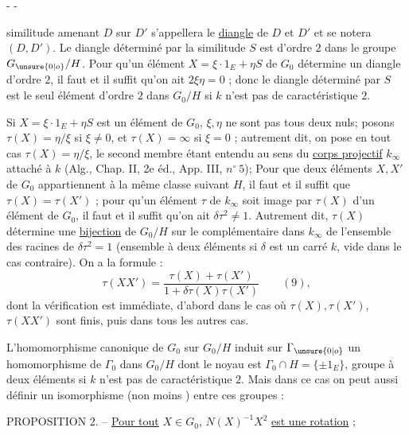 -  -

similitude amenant $D$ sur $D'$ s'appellera le \uline{diangle} de $D$ et $D'$ et se notera $(D,D')$. Le diangle déterminé par la similitude $S$ est d'ordre $2$ dans le groupe $G_{\unsure{0|o}}/H$. Pour qu'un élément $X=\xi\cdot1_E+\eta S$ de $G_0$ détermine un diangle d'ordre $2$, il faut et il suffit qu'on ait $2\xi\eta=0$ ; donc le diangle déterminé par $S$ est le seul élément d'ordre $2$ dans $G_0/H$ si $k$ n'est pas de caractéristique $2$.

Si $X=\xi\cdot1_E+\eta S$ est un élément de $G_0$, $\xi,\eta$ ne sont pas tous deux nuls; posons $\tau(X)=\eta/\xi$ si $\xi\ne0$, et $\tau(X)=\infty$ si $\xi=0$ ; autrement dit, on pose en tout cas $\tau(X)=\eta/\xi$, le second membre étant entendu au sens du \uline{corps projectif} $k_\infty$ attaché à $k$ (Alg., Chap. II, 2e éd., App. III, $n^\circ\ 5$); Pour que deux éléments $X,X'$ de $G_0$ appartiennent à la même classe suivant $H$, il faut et il suffit que $\tau(X)=\tau(X')$ ; pour qu'un élément $\tau$ de $k_\infty$ soit image par $\tau(X)$ d'un élément de $G_0$, il faut et il suffit qu'on ait $\delta\tau^2\ne1$. Autrement dit, $\tau(X)$ détermine une \uline{bijection} de $G_0/H$ sur le complémentaire dans $k_\infty$ de l'ensemble des racines de $\delta\tau^2=1$ (ensemble à deux éléments si $\delta$ est un carré  $k$, vide dans le cas contraire). On a la formule :
\[
\tau(XX')=\frac{\tau(X)+\tau(X')}{1+\delta\tau(X)\tau(X')}\qquad(9),
\]
dont la vérification est immédiate, d'abord dans le cas où $\tau(X),\tau(X')$, $\tau(XX')$ sont finis, puis dans tous les autres cas.

L'homomorphisme canonique de $G_0$ sur $G_0/H$ induit sur $\Gamma_{\unsure{0|o}}$ un homomorphisme de $\Gamma_0$ dans $G_0/H$ dont le noyau est $\Gamma_0\cap H=\{\pm1_E\}$, groupe à deux éléments si $k$ n'est pas de caractéristique $2$. Mais dans ce cas on peut aussi définir un isomorphisme (non moins ) entre ces groupes :

PROPOSITION 2. -- \uline{Pour tout} $X\in G_0$, $N(X)^{-1}X^2$ \uline{est une rotation} ;
